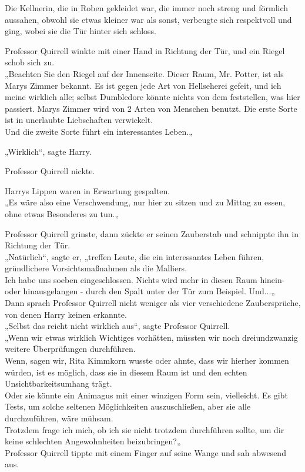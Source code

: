 {Die Kellnerin, die in Roben gekleidet war, die immer noch streng und förmlich aussahen, obwohl sie etwas kleiner war als sonst, verbeugte sich respektvoll und ging, wobei sie die Tür hinter sich schloss.

Professor Quirrell winkte mit einer Hand in Richtung der Tür, und ein Riegel schob sich zu.\\ „Beachten Sie den Riegel auf der Innenseite. Dieser Raum, Mr. Potter, ist als Marys Zimmer bekannt. Es ist gegen jede Art von Hellseherei gefeit, und ich meine wirklich alle; selbst Dumbledore könnte nichts von dem feststellen, was hier passiert. Marys Zimmer wird von 2 Arten von Menschen benutzt. Die erste Sorte ist in unerlaubte Liebschaften verwickelt.\\ Und die zweite Sorte führt ein interessantes Leben.„

„Wirklich“, sagte Harry.

Professor Quirrell nickte.

Harrys Lippen waren in Erwartung gespalten.\\ „Es wäre also eine Verschwendung, nur hier zu sitzen und zu Mittag zu essen, ohne etwas Besonderes zu tun.„

Professor Quirrell grinste, dann zückte er seinen Zauberstab und schnippte ihn in Richtung der Tür.\\ „Natürlich“, sagte er, „treffen Leute, die ein interessantes Leben führen, gründlichere Vorsichtsmaßnahmen als die Malliers.\\ Ich habe uns soeben eingeschlossen. Nichts wird mehr in diesen Raum hinein- oder hinausgelangen - durch den Spalt unter der Tür zum Beispiel. Und...„\\ Dann sprach Professor Quirrell nicht weniger als vier verschiedene Zaubersprüche, von denen Harry keinen erkannte.\\ „Selbst das reicht nicht wirklich aus“, sagte Professor Quirrell.\\ „Wenn wir etwas wirklich Wichtiges vorhätten, müssten wir noch dreiundzwanzig weitere Überprüfungen durchführen.\\ Wenn, sagen wir, Rita Kimmkorn wusste oder ahnte, dass wir hierher kommen würden, ist es möglich, dass sie in diesem Raum ist und den echten Unsichtbarkeitsumhang trägt.\\ Oder sie könnte ein Animagus mit einer winzigen Form sein, vielleicht. Es gibt Tests, um solche seltenen Möglichkeiten auszuschließen, aber sie alle durchzuführen, wäre mühsam.\\ Trotzdem frage ich mich, ob ich sie nicht trotzdem durchführen sollte, um dir keine schlechten Angewohnheiten beizubringen?„\\ Professor Quirrell tippte mit einem Finger auf seine Wange und sah abwesend aus.

}
